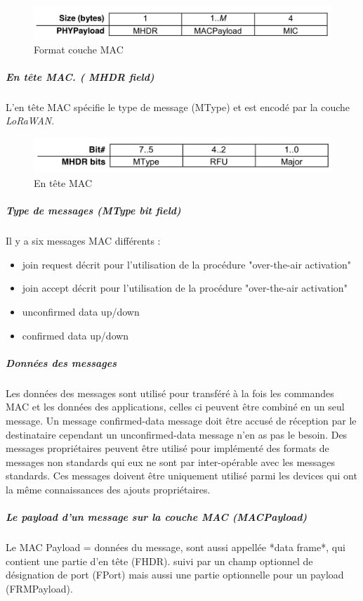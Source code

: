 \documentclass[11pt]{article}
\begin{document}
\begin{figure}[h!]
\centering
\includegraphics[scale=0.6]{A_phyload.png}
\caption{Format couche MAC}
\end{figure}


\newpage
\subparagraph{En tête MAC. ( MHDR field)}
L'en tête MAC spécifie le type de message (MType) et est encodé par la couche  \textit{LoRaWAN}.
\begin{figure}[h!]
\centering
\includegraphics[scale=0.6]{A_mac_header.png}
\caption{En tête MAC}
\end{figure}


\subparagraph{ Type de messages (MType bit field)}
Il y a six messages MAC différents : 
\begin{itemize}
\item join request décrit pour l'utilisation de la procédure "over-the-air activation"
\item join accept décrit pour l'utilisation de la procédure "over-the-air activation"
\item unconfirmed data up/down
\item confirmed data up/down
\end{itemize}

\subparagraph{Données des messages}

Les données des messages sont utilisé pour transféré à la fois les commandes MAC et les données des applications, celles ci peuvent être combiné en un seul message. Un message confirmed-data message doit être accusé de réception par le destinataire cependant un unconfirmed-data message n'en as pas le besoin. Des messages propriétaires peuvent être utilisé pour implémenté des formats de messages non standards qui eux ne sont par inter-opérable avec les messages standards. Ces messages doivent être uniquement utilisé parmi les devices qui ont la même connaissances des ajouts propriétaires.

\subparagraph{ Le payload d'un message sur la couche MAC (MACPayload)}
Le MAC Payload = données du message, sont aussi appellée *data frame*, qui contient une partie d'en tête (FHDR). suivi par un champ optionnel de désignation de port (FPort) mais aussi une partie optionnelle pour un payload (FRMPayload).
\end{document}
